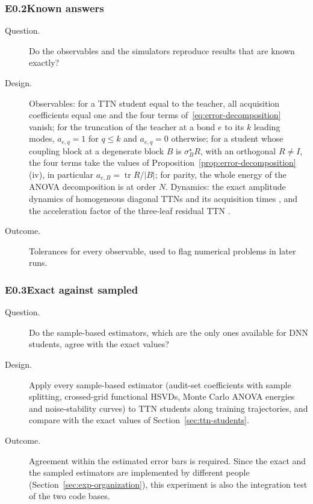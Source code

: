 \documentclass[11pt]{article}
\theoremstyle{definition}
\numberwithin{equation}{section}
\begin{document}
\subsubsection*{E0.2\quad Known answers}
\begin{description}
\item[Question.] Do the observables and the simulators reproduce results that are known exactly?
\item[Design.] Observables: for a TTN student equal to the teacher, all acquisition coefficients equal one and the four terms of~\eqref{eq:error-decomposition} vanish; for the truncation of the teacher at a bond $e$ to its $k$ leading modes, $a_{e,q}=1$ for $q\le k$ and $a_{e,q}=0$ otherwise; for a student whose coupling block at a degenerate block $B$ is $\sigma^\star_BR$, with an orthogonal $R\ne I$, the four terms take the values of Proposition~\ref{prop:error-decomposition}(iv), in particular $a_{e,B}=\operatorname{tr}R/|B|$; for parity, the whole energy of the ANOVA decomposition is at order $N$. Dynamics: the exact amplitude dynamics of homogeneous diagonal TTNs and its acquisition times \citep[Section~4]{hfl_diagonal}, and the acceleration factor of the three-leaf residual TTN \citep[Proposition~6.1]{hfl_diagonal}.
\item[Outcome.] Tolerances for every observable, used to flag numerical problems in later runs.
\end{description}

\subsubsection*{E0.3\quad Exact against sampled}
\begin{description}
\item[Question.] Do the sample-based estimators, which are the only ones available for DNN students, agree with the exact values?
\item[Design.] Apply every sample-based estimator (audit-set coefficients with sample splitting, crossed-grid functional HSVDs, Monte Carlo ANOVA energies and noise-stability curves) to TTN students along training trajectories, and compare with the exact values of Section~\ref{sec:ttn-students}.
\item[Outcome.] Agreement within the estimated error bars is required. Since the exact and the sampled estimators are implemented by different people (Section~\ref{sec:exp-organization}), this experiment is also the integration test of the two code bases.
\end{description}
\end{document}
